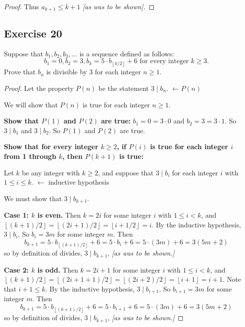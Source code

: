 \documentclass[14pt]{extarticle}
\newcommand{\dps}{\displaystyle}
\newcommand{\from}{\leftarrow}
\newcommand{\floor}[1]{{\left\lfloor#1\right\rfloor}}
\newcommand{\cy}{\color{cyan}}
\begin{document}
\begin{proof}
    Thus $a_{k+1} \leq k + 1$ {\it [as was to be shown].}
\end{proof}

\subsection{Exercise 20}
Suppose that $b_1, b_2, b_3, \ldots$ is a sequence defined as follows:
\[
    b_1 = 0, b_2 = 3, b_k = 5 \cdot b_{\floor{k/2}} + 6 \text{ for every integer } k \geq 3.
\]
Prove that $b_n$ is divisible by 3 for each integer $n \geq 1$.

\begin{proof}
    Let the property $P(n)$ be the statement $3 \mid b_n$. {\cy $\from P(n)$}

    We will show that $P(n)$ is true for each integer $n \geq 1$.

        {\bf Show that $P(1)$ and $P(2)$ are true:}
    $b_1 = 0 = 3 \cdot 0$ and $b_2 = 3 = 3 \cdot 1$.
    So $3 \mid b_1$ and $3 \mid b_2$.
    So $P(1)$ and $P(2)$ are true.

        {\bf Show that for every integer $k \geq 2$, if $P(i)$ is
            true for each integer $i$ from 1 through $k$, then $P(k + 1)$ is true:}

    Let $k$ be any integer with $k \geq 2$, and suppose that
    $3 \mid b_i$ for each integer $i$ with $1 \leq i \leq k$.
        {\cy $\from$ inductive hypothesis}

    We must show that $3 \mid b_{k+1}$.

        {\bf Case 1: $k$ is even.}
    Then $k = 2i$ for some integer $i$ with $1 \leq i < k$, and
    $\dps \floor{(k+1)/2} = \floor{(2i+1)/2} = \floor{i+1/2} = i$.
    By the inductive hypothesis, $3 \mid b_i$. So $b_i = 3m$ for some integer $m$. Then
    \[
        b_{k+1} = 5 \cdot b_{\floor{(k + 1)/2}} + 6 = 5 \cdot b_i + 6 = 5 \cdot (3m) + 6 = 3(5m + 2)
    \]
    so by definition of divides, $3 \mid b_{k+1}$, {\it [as was to be shown.]}

        {\bf Case 2: $k$ is odd.}
    Then $k = 2i + 1$ for some integer $i$ with $1 \leq i < k$,
    and $\dps \floor{(k + 1)/2} = \floor{(2i + 1 + 1)/2} = \floor{(2i + 2)/2} = \floor{i+1}= i+1$.
    Note that $i + 1 \leq k$.
    By the inductive hypothesis, $3 \mid b_{i + 1}$. So $b_{i + 1} = 3m$ for some integer $m$. Then
    \[
        b_{k+1} = 5 \cdot b_{\floor{(k + 1)/2}} + 6 = 5 \cdot b_{i + 1} + 6 = 5 \cdot (3m) + 6 = 3(5m + 2)
    \]
    so by definition of divides, $3 \mid b_{k+1}$, {\it [as was to be shown.]}
\end{proof}
\end{document}
